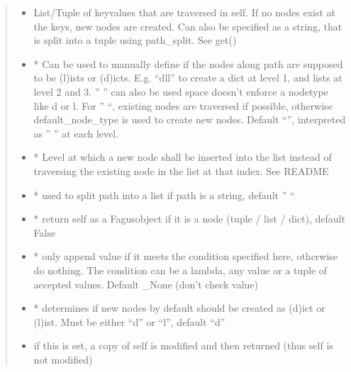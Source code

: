 \documentclass[a4paper,10pt,english]{sphinxmanual}
\begin{document}
\begin{fulllineitems}
\begin{fulllineitems}
\begin{quote}
\begin{description}
\begin{itemize}
\item {}
\sphinxAtStartPar
{} \textendash{} List/Tuple of key\sphinxhyphen{}values that are traversed in self. If no nodes exist at the keys, new nodes are
created. Can also be specified as a string, that is split into a tuple using path\_split. See get()

\item {}
\sphinxAtStartPar
{} \textendash{} * Can be used to manually define if the nodes along path are supposed to be (l)ists or
(d)icts. E.g. “dll” to create a dict at level 1, and lists at level 2 and 3. ” ” can also be used \sphinxhyphen{}
space doesn’t enforce a node\sphinxhyphen{}type like d or l. For ” “, existing nodes are traversed if possible,
otherwise default\_node\_type is used to create new nodes. Default “”, interpreted as ” ” at each level.

\item {}
\sphinxAtStartPar
{} \textendash{} * Level at which a new node shall be inserted into the list instead of traversing the
existing node in the list at that index. See README

\item {}
\sphinxAtStartPar
{} \textendash{} * used to split path into a list if path is a string, default ” “

\item {}
\sphinxAtStartPar
{} \textendash{} * return self as a Fagus\sphinxhyphen{}object if it is a node (tuple / list / dict), default False

\item {}
\sphinxAtStartPar
{} \textendash{} * only append value if it meets the condition specified here, otherwise do nothing. The condition can
be a lambda, any value or a tuple of accepted values. Default \_None (don’t check value)

\item {}
\sphinxAtStartPar
{} \textendash{} * determines if new nodes by default should be created as (d)ict or (l)ist. Must be
either “d” or “l”, default “d”

\item {}
\sphinxAtStartPar
{} \textendash{} if this is set, a copy of self is modified and then returned (thus self is not modified)


\end{itemize}
\end{description}
\end{quote}
\end{fulllineitems}
\end{fulllineitems}
\end{document}

